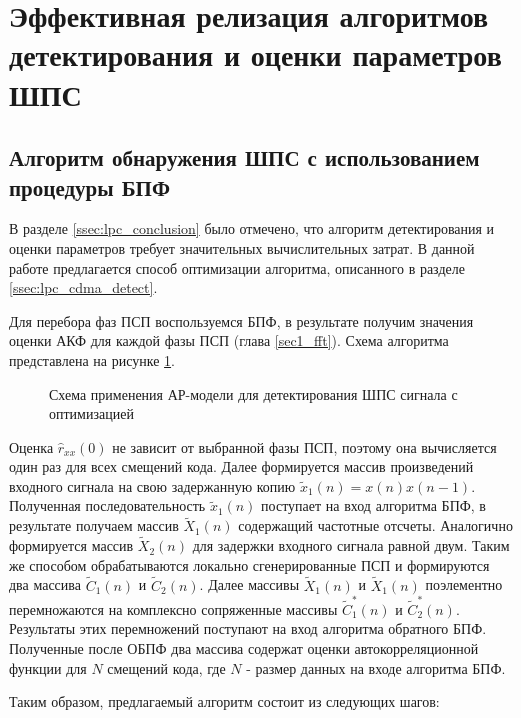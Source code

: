 \section{Эффективная релизация алгоритмов детектирования и оценки параметров ШПС}

\subsection{Алгоритм обнаружения ШПС с использованием процедуры БПФ}

В разделе \ref{ssec:lpc_conclusion} было отмечено, что алгоритм детектирования и оценки параметров
требует значительных вычислительных затрат. В данной работе предлагается способ оптимизации алгоритма,
описанного в разделе \ref{ssec:lpc_cdma_detect}.

Для перебора фаз ПСП воспользуемся БПФ, в результате получим значения оценки АКФ для каждой фазы ПСП (глава \ref{sec1_fft}).
Схема алгоритма представлена на рисунке \ref{pic:lpc_basic2}. 

\begin{figure}[H]
	\center{}
	\caption{Схема применения АР-модели для детектирования ШПС сигнала с оптимизацией}
	\label{pic:lpc_basic2}
\end{figure}

Оценка ${\hat{r}_{xx}(0)}$ не зависит от выбранной фазы ПСП, поэтому она вычисляется один
раз для всех смещений кода. Далее формируется массив произведений входного сигнала на
свою задержанную копию ${\tilde{x}_1(n)=x(n)x(n-1)}$. Полученная последовательность  
${\tilde{x}_1(n)}$ поступает на вход алгоритма БПФ, в результате получаем массив ${\tilde{X}_1(n)}$
содержащий частотные отсчеты. Аналогично формируется массив  ${\tilde{X}_2(n)}$ для
задержки входного сигнала равной двум. Таким же способом обрабатываются локально
сгенерированные ПСП и формируются два массива ${\tilde{C}_1(n)}$ и ${\tilde{C}_2(n)}$.
Далее массивы ${\tilde{X}_1(n)}$ и ${\tilde{X}_1(n)}$ поэлементно перемножаются
на комплексно сопряженные массивы ${\tilde{C}_1^*(n)}$ и ${\tilde{C}_2^*(n)}$.
Результаты этих перемножений поступают на вход алгоритма обратного
БПФ. Полученные после ОБПФ два массива содержат оценки автокорреляционной функции для ${N}$ 
смещений кода, где  ${N}$ - размер данных на входе алгоритма БПФ.

Таким образом, предлагаемый алгоритм состоит из следующих шагов:

